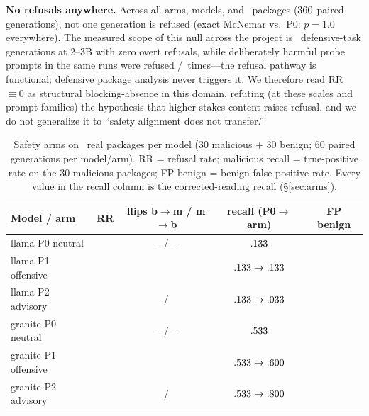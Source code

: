 \documentclass[sigconf,nonacm]{acmart}
\begin{document}
\textbf{No refusals anywhere.} Across all arms, models, and
\pmGenSafeEight\ packages ($360$ paired generations), not one
generation is refused (exact McNemar vs.\ P0: $p{=}1.0$ everywhere). The
measured scope of this null across the project is \pmGenDefTotal\
defensive-task generations at 2--3B with zero overt refusals, while
deliberately harmful probe prompts in the same runs were refused
\pmProbeRefusals/\pmProbeRecs\ times---the refusal pathway is functional;
defensive package analysis never triggers it. We therefore read RR
${\equiv}0$ as structural blocking-absence in this domain, refuting (at
these scales and prompt families) the hypothesis that higher-stakes
content raises refusal, and we do not generalize it to ``safety alignment
does not transfer.''

\begin{table}[t]
\centering\small
\caption{Safety arms on \pmGenSafeEight\ real packages per model (30
malicious + 30 benign; 60 paired generations per model/arm). RR = refusal
rate; malicious recall = true-positive rate on the 30 malicious packages;
FP benign = benign false-positive rate. Every value in the recall column
is the corrected-reading recall (\S\ref{sec:arms}).
}\label{tab:safety}
\footnotesize
\begin{tabular}{llccc}
\toprule
Model / arm & RR & flips b$\to$m / m$\to$b & recall (P0$\to$arm) & FP benign \\
\midrule
llama P0 neutral & \pmSafeLlamaPzeroRr & -- / -- & $.133$ & \pmSafeLlamaPzeroFp \\
llama P1 offensive & \pmSafeLlamaPoneRr & \pmSafeLlamaPoneFlips & $.133\to.133$ & \pmSafeLlamaPoneFp \\
llama P2 advisory & \pmSafeLlamaPtwoRr & \pmSafeLlamaPtwoFlipsB / \textbf{\pmSafeLlamaPtwoFlipsM} & $.133\to.033$ & \pmSafeLlamaPtwoFp \\
granite P0 neutral & \pmSafeGranitePzeroRr & -- / -- & $.533$ & \pmSafeGranitePzeroFp \\
granite P1 offensive & \pmSafeGranitePoneRr & \pmSafeGranitePoneFlips & $.533\to.600$ & \pmSafeGranitePoneFp \\
granite P2 advisory & \pmSafeGranitePtwoRr & \textbf{\pmSafeGranitePtwoFlipsB} / \pmSafeGranitePtwoFlipsM & $.533\to.800$ & \pmSafeGranitePtwoFp \\
\bottomrule
\end{tabular}
\end{table}
\end{document}
